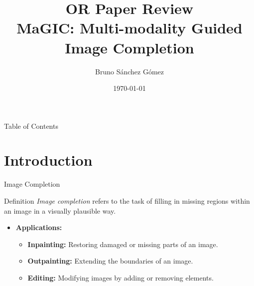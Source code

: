 \documentclass[pdf]{beamer}
\title{OR Paper Review \\MaGIC:  Multi-modality Guided Image Completion}
\author{Bruno Sánchez Gómez}
\date{\today}
\begin{document}
\begin{frame}
    \titlepage
\end{frame}


\begin{frame}{Table of Contents}
    \tableofcontents
\end{frame}

\section{Introduction}

\begin{frame}{Image Completion}
    \centering
    \begin{minipage}{0.8\textwidth}
        \begin{block}{Definition}
            \centering
            \textit{Image completion} refers to the task of filling in missing regions within an image in a visually plausible way.
        \end{block}
    \end{minipage}
    \vspace{0.5cm}
    \begin{itemize}
        \item \textbf{Applications:}
            \begin{itemize}
                \item \textbf{Inpainting:} Restoring damaged or missing parts of an image.
                \item \textbf{Outpainting:} Extending the boundaries of an image.
                \item \textbf{Editing:} Modifying images by adding or removing elements.
            \end{itemize}
    \end{itemize}
\end{frame}
\end{document}
